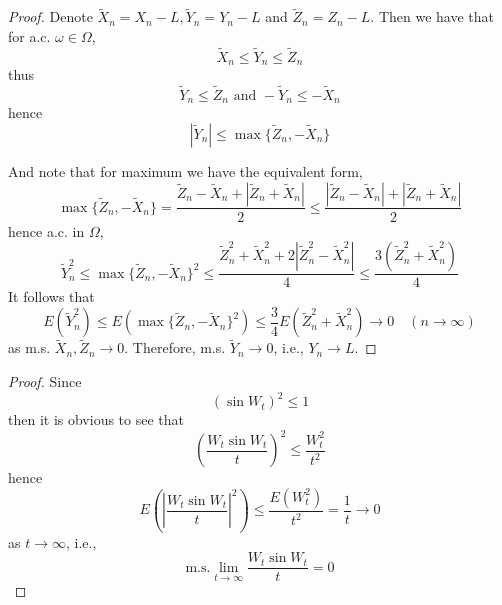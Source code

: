\documentclass{homework}
\begin{document}
    \problem
    \begin{subproblem}
        \item
        \begin{proof}
            Denote $\tilde X_n=X_n-L,\tilde Y_n=Y_n-L$
            and $\tilde Z_n=Z_n-L$. Then we have that for a.c.
            $\omega\in\Omega$,
            \[\tilde X_n\leq\tilde Y_n\leq\tilde Z_n\]
            thus
            \[\tilde Y_n\leq\tilde Z_n\text{ and }
            -\tilde Y_n\leq-\tilde X_n\]
            hence
            \[|\tilde Y_n|\leq\max\{\tilde Z_n,-\tilde X_n\}\]

            And note that for maximum we have the equivalent form,
            \[\max\{\tilde Z_n,-\tilde X_n\}
            =\frac{\tilde Z_n-\tilde X_n+|\tilde Z_n+\tilde X_n|}{2}
            \leq\frac{|\tilde Z_n-\tilde X_n|+|\tilde Z_n+\tilde X_n|}{2}\]
            hence a.c. in $\Omega$,
            \[\tilde Y^2_n\leq
            \max\{\tilde Z_n,-\tilde X_n\}^2
            \leq\frac{\tilde Z_n^2+\tilde X_n^2+2|\tilde Z_n^2-\tilde X_n^2|}{4}
            \leq\frac{3(\tilde Z_n^2+\tilde X_n^2)}{4}\]
            It follows that
            \[E(\tilde Y_n^2)
            \leq E(\max\{\tilde Z_n,-\tilde X_n\}^2)
            \leq\frac{3}{4}E(\tilde Z_n^2+\tilde X_n^2)
            \to 0\quad(n\to\infty)\]
            as m.s. $\tilde X_n,\tilde Z_n\to 0$. Therefore,
            m.s. $\tilde Y_n\to 0$, i.e., $Y_n\to L$.
        \end{proof}

        \item
        \begin{proof}
            Since
            \[(\sin W_t)^2\leq 1\]
            then it is obvious to see that
            \[\left(\frac{W_t\sin W_t}{t}\right)^2\leq\frac{W_t^2}{t^2}\]
            hence
            \[E\left(\left|\frac{W_t\sin W_t}{t}\right|^2\right)
            \leq\frac{E(W_t^2)}{t^2}=\frac{1}{t}\to 0\]
            as $t\to\infty$, i.e.,
            \[\text{m.s.}\lim_{t\to\infty}\frac{W_t\sin W_t}{t}=0\]
        \end{proof}
    \end{subproblem}
\end{document}
